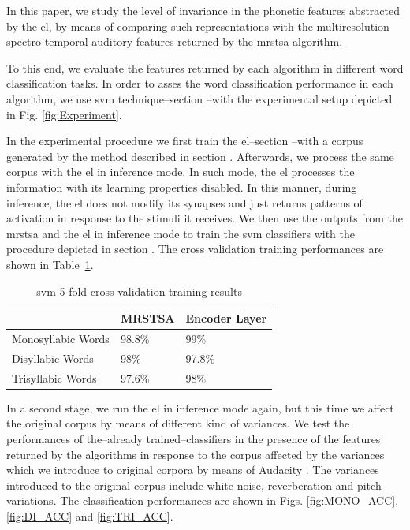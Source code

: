 \documentclass[10pt,letterpaper]{article}
\begin{document}
In this paper, we study the level of invariance in the phonetic features abstracted by the \gls{el},
by means of comparing such representations with the multiresolution spectro-temporal auditory features
returned by the \gls{mrstsa} algorithm.

To this end, we evaluate the features returned by each algorithm in different word classification tasks.
In order to asses the word classification performance in each algorithm, we use \gls{svm}
technique--section --with 
the experimental setup depicted in Fig. \ref{fig:Experiment}.

In the experimental procedure we first train the \gls{el}--section --with a corpus generated by the method described in section .
Afterwards, we process the same corpus with the \gls{el} in inference mode.
In such mode, the \gls{el} processes the information with its learning properties disabled.
In this manner, during inference, the \gls{el} does not modify its synapses and just returns patterns of activation in
response to the stimuli it receives.
We then use the outputs from the \gls{mrstsa} and the \gls{el} in inference mode to train the
\gls{svm} classifiers with the procedure depicted in section .
The cross validation training performances are shown in Table~\ref{SVM_Training}.

\begin{table}[h!]
\centering
\caption{\gls{svm} 5-fold cross validation training results}
\begin{tabular}{|l|l|l|}
\hline
                   & MRSTSA & Encoder Layer \\ \hline
Monosyllabic Words & 98.8\% & 99\%          \\ \hline
Disyllabic Words   & 98\%   & 97.8\%        \\ \hline
Trisyllabic Words  & 97.6\% & 98\%          \\ \hline
\end{tabular}
\label{SVM_Training}
\end{table}

\pagebreak

In a second stage, we run the \gls{el} in inference mode again, but this time we affect the original corpus by means of different kind of variances. 
We test the performances of the--already trained--classifiers in the presence of the features returned by the algorithms in response to the corpus affected
by the variances which we introduce to original corpora by means of Audacity \cite{audacity}.
The variances introduced to the original corpus include white noise, reverberation and pitch variations.
The classification performances are shown in Figs. \ref{fig:MONO_ACC}, \ref{fig:DI_ACC} and \ref{fig:TRI_ACC}.
\end{document}
